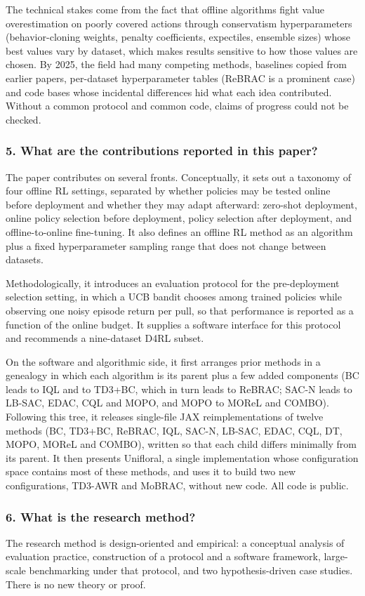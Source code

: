 \documentclass[11pt]{article}
\newcommand{\question}[1]{\subsubsection*{#1}}
\begin{document}
The technical stakes come from the fact that offline algorithms fight value overestimation on poorly covered actions through conservatism hyperparameters (behavior-cloning weights, penalty coefficients, expectiles, ensemble sizes) whose best values vary by dataset, which makes results sensitive to how those values are chosen. By 2025, the field had many competing methods, baselines copied from earlier papers, per-dataset hyperparameter tables (ReBRAC is a prominent case) and code bases whose incidental differences hid what each idea contributed. Without a common protocol and common code, claims of progress could not be checked.

\question{5. What are the contributions reported in this paper?}

The paper contributes on several fronts. Conceptually, it sets out a taxonomy of four offline RL settings, separated by whether policies may be tested online before deployment and whether they may adapt afterward: zero-shot deployment, online policy selection before deployment, policy selection after deployment, and offline-to-online fine-tuning. It also defines an offline RL method as an algorithm plus a fixed hyperparameter sampling range that does not change between datasets.

Methodologically, it introduces an evaluation protocol for the pre-deployment selection setting, in which a UCB bandit chooses among trained policies while observing one noisy episode return per pull, so that performance is reported as a function of the online budget. It supplies a software interface for this protocol and recommends a nine-dataset D4RL subset.

On the software and algorithmic side, it first arranges prior methods in a genealogy in which each algorithm is its parent plus a few added components (BC leads to IQL and to TD3+BC, which in turn leads to ReBRAC; SAC-N leads to LB-SAC, EDAC, CQL and MOPO, and MOPO to MOReL and COMBO). Following this tree, it releases single-file JAX reimplementations of twelve methods (BC, TD3+BC, ReBRAC, IQL, SAC-N, LB-SAC, EDAC, CQL, DT, MOPO, MOReL and COMBO), written so that each child differs minimally from its parent. It then presents Unifloral, a single implementation whose configuration space contains most of these methods, and uses it to build two new configurations, TD3-AWR and MoBRAC, without new code. All code is public.

\question{6. What is the research method?}

The research method is design-oriented and empirical: a conceptual analysis of evaluation practice, construction of a protocol and a software framework, large-scale benchmarking under that protocol, and two hypothesis-driven case studies. There is no new theory or proof.
\end{document}
